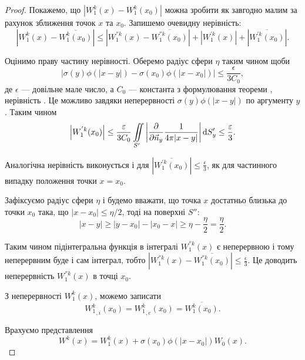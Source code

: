 \begin{proof}
	Покажемо, що $|W_1^k(x) - W_1^k(x_0)|$ можна зробити як завгодно малим за рахунок зближення точок $x$ та $x_0$. Запишемо очевидну нерівність:
	\begin{equation}
		\left| W_1^k(x) - \overline{W_1^k(x_0)} \right| \le \left| W_1^{''k}(x) - \overline{W_1^{''k}(x_0)} \right| + \left| W_1^{'k}(x) \right | + \left| \overline{W_1^{'k}(x_0)} \right|.
	\end{equation}

	Оцінимо праву частину нерівності. Оберемо радіус сфери $\eta$ таким чином щоби
	\begin{equation}
		\Big| \sigma(y) \phi(|x - y|) - \sigma(x_0) \phi(|x - x_0|) \Big| \le \frac{\epsilon}{3 C_0},
	\end{equation}
		де $\epsilon$ --- довільне мале число, а $C_0$ --- константа з формулювання теореми , нерівність . Це можливо завдяки неперервності $\sigma(y) \phi(|x - y|)$ по аргументу $y$. Таким чином
	\begin{equation}
		\left| W_1^{'k} (x_0) \right| \le \frac{\varepsilon}{3 C_0} \displaystyle\iint\limits_{S'} \left| \frac{\partial}{\partial \vec n_y} \frac{1}{4 \pi |x - y|} \right| \mathop{}\!\mathrm{d} S_y' \le \frac{\varepsilon}{3}.
	\end{equation}

	Аналогічна нерівність виконується і для $\left| \overline{W_1^{'k}(x_0)} \right| \le \frac{\epsilon}{3}$, як для частинного випадку положення точки $x=x_0$. \medskip

	Зафіксуємо радіус сфери $\eta$ і будемо вважати, що точка $x$ достатньо близька до точки $x_0$ така, що $|x - x_0| \le \eta/2$, тоді на поверхні $S''$:
	\begin{equation}
		|x - y| \ge |y - x_0| - |x_0 - x| \ge \eta - \frac{\eta}{2} = \frac{\eta}{2}.
	\end{equation}

	Таким чином підінтегральна функція в інтегралі $W_1^{''k}(x)$ є неперервною і тому неперервним буде і сам інтеграл, тобто $\left| W_1^{''k}(x) - \overline{W_1^{''k}(x_0)} \right| \le \frac{\epsilon}{3}$. Це доводить неперервність $W_1^{''k}(x)$ в точці $x_0$. \medskip

	З неперервності $W_1^k(x)$, можемо записати 
	\begin{equation}
		{W_1^k}_{,i}(x_0) = {W_1^k}_{,e}(x_0) = \overline{W_1^k(x_0)}.
	\end{equation}

	Врахуємо представлення 
	\begin{equation}
		W^k(x) = W_1^k(x) + \sigma(x_0) \phi(|x - x_0|) W_0(x).
	\end{equation}


\end{proof}
